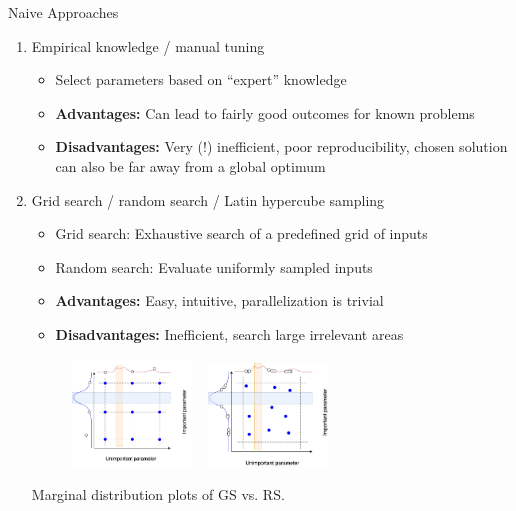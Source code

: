 \documentclass[11pt,compress,t,notes=noshow, xcolor=table]{beamer}
\begin{document}
\begin{vbframe}{Naive Approaches}
\begin{enumerate}
\item Empirical knowledge / manual tuning
\begin{itemize}
\item Select parameters based on \enquote{expert} knowledge 
\item \textbf{Advantages:} Can lead to fairly good outcomes for known problems
\item \textbf{Disadvantages:} Very (!) inefficient, poor reproducibility, chosen solution can also be far away from a global optimum
\end{itemize}

\framebreak 
\item Grid search / random search / Latin hypercube sampling
\begin{itemize}
\item Grid search: Exhaustive search of a predefined grid of inputs
\item Random search: Evaluate uniformly sampled inputs 
\item \textbf{Advantages: } Easy, intuitive, parallelization is trivial
\item \textbf{Disadvantages: } Inefficient, search large irrelevant areas
\end{itemize}

\begin{center}
\begin{figure}
\includegraphics[width=0.3\textwidth]{figure_man/01_GridSearch.png} ~ \includegraphics[width=0.3\textwidth]{figure_man/02_RandomSearch.png}
\end{figure}
\begin{footnotesize}
Marginal distribution plots of GS vs. RS.
\end{footnotesize}
\end{center}



\end{enumerate}
\end{vbframe}
\end{document}
